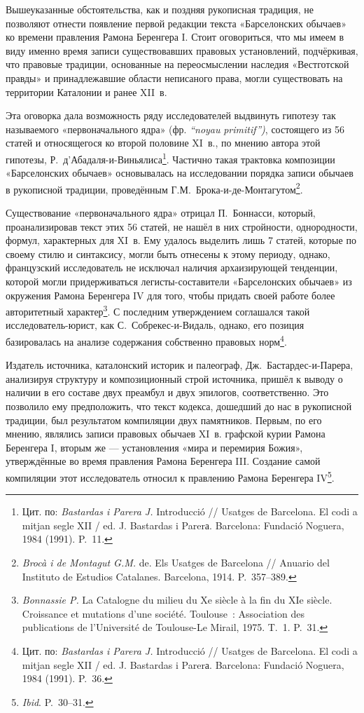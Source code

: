 Вышеуказанные обстоятельства, как и поздняя рукописная традиция, не позволяют отнести появление первой редакции текста «Барселонских обычаев» ко времени правления Рамона Беренгера I. Стоит оговориться, что мы имеем в виду именно время записи существовавших правовых установлений, подчёркивая, что правовые традиции, основанные на переосмыслении наследия «Вестготской правды» и принадлежавшие области неписаного права, могли существовать на территории Каталонии и ранее XII~в.

Эта оговорка дала возможность ряду исследователей выдвинуть гипотезу так называемого «первоначального ядра» (фр. \emph{“}\emph{noyau}\emph{ }\emph{primitif}\emph{”)}, состоящего из 56 статей и относящегося ко второй половине XI~в., по мнению автора этой гипотезы, Р.~д’Абадаля-и-Виньялиса\footnote{Цит. по: \emph{Bastardas i Parera J.} Introducció // Usatges de Barcelona. El codi a mitjan segle XII / ed. J. Bastardas i Parerа. Barcelona: Fundació Noguera, 1984 (1991). P.~11.}. Частично такая трактовка композиции «Барселонских обычаев» основывалась на исследовании порядка записи обычаев в рукописной традиции, проведённым Г.М.~Брока-и-де-Монтагутом\footnote{\emph{Brocà i de Montagut G.M. }de. Els Usatges de Barcelona // Anuario del Instituto de Estudios Catalanes. Barcelona, 1914. P.~357--389.}.

Существование «первоначального ядра» отрицал П.~Боннасси, который, проанализировав текст этих 56 статей, не нашёл в них стройности, однородности, формул, характерных для XI~в. Ему удалось выделить лишь 7 статей, которые по своему стилю и синтаксису, могли быть отнесены к этому периоду, однако, французский исследователь не исключал наличия архаизирующей тенденции, которой могли придерживаться легисты-составители «Барселонских обычаев» из окружения Рамона Беренгера IV для того, чтобы придать своей работе более авторитетный характер\footnote{\emph{Bonnassie P. }La Catalogne du milieu du Xe siècle à la fin du XIe siècle. Croissance et mutations d’une société. Toulouse~: Association des publications de l’Université de Toulouse-Le Mirail, 1975. T.~1. P.~31.}. С последним утверждением соглашался такой исследователь-юрист, как С.~Собрекес-и-Видаль, однако, его позиция базировалась на анализе содержания собственно правовых норм\footnote{Цит. по: \emph{Bastardas i Parera J.} Introducció // Usatges de Barcelona. El codi a mitjan segle XII / ed. J. Bastardas i Parerа. Barcelona: Fundació Noguera, 1984 (1991). P.~36.}.

Издатель источника, каталонский историк и палеограф, Дж.~Бастардес-и-Парера, анализируя структуру и композиционный строй источника, пришёл к выводу о наличии в его составе двух преамбул и двух эпилогов, соответственно. Это позволило ему предположить, что текст кодекса, дошедший до нас в рукописной традиции, был результатом компиляции двух памятников. Первым, по его мнению, являлись записи правовых обычаев XI~в. графской курии Рамона Беренгера I, вторым же --- установления «мира и перемирия Божия», утверждённые во время правления Рамона Беренгера III. Создание самой компиляции этот исследователь относил к правлению Рамона Беренгера IV\footnote{\emph{Ibid}. P.~30--31.}.

